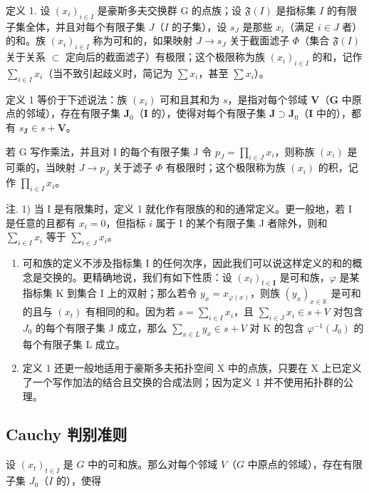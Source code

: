 定义 1. 设 \((x_{i})_{i\in I}\) 是豪斯多夫交换群 G 的点族；设 \(\mathfrak{F}(I)\) 是指标集 \(I\) 的有限子集全体，并且对每个有限子集 \(J\)（\(I\) 的子集），设 \(s_J\) 是那些 \(x_{i}\)（满足 \(i\in J\) 者）的和。族 \((x_{i})_{i\in I}\) 称为可和的，如果映射 \(J\to s_J\) 关于截面滤子 \(\Phi\)（集合 \(\mathfrak{F}(I)\) 关于关系 \(\subset\) 定向后的截面滤子）有极限；这个极限称为族 \((x_{i})_{i\in I}\) 的和，记作 \(\sum_{i\in I}x_{i}\)（当不致引起歧义时，简记为 \(\sum x_{i}\)，甚至 \(\sum x_{i}\)）。

定义 1 等价于下述说法：族 \((x_{i})\) 可和且其和为 \(s\)，是指对每个邻域 \(\mathbf{V}\)（\(\mathbf{G}\) 中原点的邻域），存在有限子集 \(\mathbf{J}_0\)（\(\mathbf{I}\) 的），使得对每个有限子集 \(\mathbf{J} \supset \mathbf{J}_0\)（\(\mathbf{I}\) 中的），都有 \(s_{\mathbf{J}} \in s + \mathbf{V}\)。

若 G 写作乘法，并且对 I 的每个有限子集 J 令 \(p_{J} = \prod_{i \in J} x_i\)，则称族 \((x_i)\) 是可乘的，当映射 \(J \to p_J\) 关于滤子 \(\Phi\) 有极限时；这个极限称为族 \((x_i)\) 的积，记作 \(\prod_{i \in I} x_i\)。

注. 1) 当 I 是有限集时，定义 1 就化作有限族的和的通常定义。更一般地，若 I 是任意的且都有 \(x_{i} = 0\)，但指标 \(i\) 属于 I 的某个有限子集 J 者除外，则和 \(\sum_{i \in I} x_{i}\) 等于 \(\sum_{i \in J} x_{i}\)。

\begin{enumerate}
\def\labelenumi{\arabic{enumi})}
\setcounter{enumi}{1}
\item
  可和族的定义不涉及指标集 I 的任何次序，因此我们可以说这样定义的和的概念是交换的。更精确地说，我们有如下性质：设 \((x_{t})_{t\in \mathbf{I}}\) 是可和族，\(\varphi\) 是某指标集 K 到集合 I 上的双射；那么若令 \(y_{x} = x_{\varphi (x)}\)，则族 \((y_{x})_{x\in \mathbb{K}}\) 是可和的且与 \((x_{t})\) 有相同的和。因为若 \(s = \sum_{i\in I}x_i\)，且 \(\sum_{i\in J}x_i\in s + V\) 对包含 \(J_0\) 的每个有限子集 J 成立，那么 \(\sum_{x\in L}y_x\in s + V\) 对 K 的包含 \(\varphi^{-1}(J_0)\) 的每个有限子集 L 成立。
\item
  定义 1 还更一般地适用于豪斯多夫拓扑空间 X 中的点族，只要在 X 上已定义了一个写作加法的结合且交换的合成法则；因为定义 1 并不使用拓扑群的公理。
\end{enumerate}

\subsection{Cauchy 判别准则}

设 \((x_{t})_{t\in I}\) 是 \(G\) 中的可和族。那么对每个邻域 \(V\)（\(G\) 中原点的邻域），存在有限子集 \(J_{0}\)（\(I\) 的），使得

